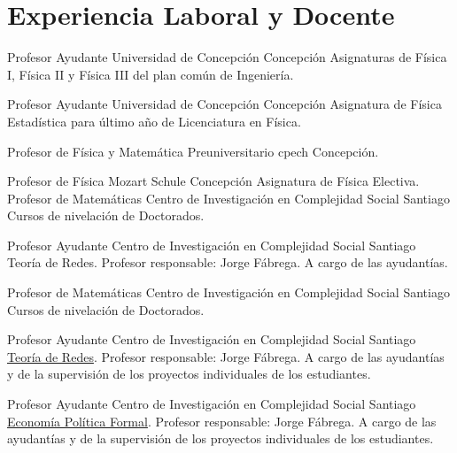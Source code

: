 \section{Experiencia Laboral y Docente}


        {Profesor Ayudante}
        {Universidad de Concepción}
        {Concepción} 
        {Asignaturas de Física I, Física II y Física III del plan común de Ingeniería.}   %
        {}

        {Profesor Ayudante}
        {Universidad de Concepción}
        {Concepción}
        {Asignatura de Física Estadística para último año de Licenciatura en Física.}  %
        {}


        {Profesor de Física y Matemática}
        {Preuniversitario cpech}
        {Concepción.}
        {}   %
        {}

        {Profesor de Física}
        {Mozart Schule}
        {Concepción}
        {Asignatura de Física Electiva.}   %
        {}
        {Profesor de Matemáticas}
        {Centro de Investigación en Complejidad Social}
        {Santiago}
        {\newline Cursos de nivelación de Doctorados.}
        {}

        {Profesor Ayudante}
        {Centro de Investigación en Complejidad Social}
        {Santiago}
        {\newline Teoría de Redes. Profesor responsable: Jorge Fábrega. A cargo de las ayudantías.}
        {}

        {Profesor de Matemáticas}
        {Centro de Investigación en Complejidad Social}
        {Santiago}
        {\newline Cursos de nivelación de Doctorados.}
        {}

        {Profesor Ayudante}
        {Centro de Investigación en Complejidad Social}
        {Santiago}
        {\newline \href{https://github.com/aoliveram/Redes-Sociales-2025}{Teoría de Redes}. Profesor responsable: Jorge Fábrega. A cargo de las ayudantías y de la supervisión de los proyectos individuales de los estudiantes.}
        {}

        {Profesor Ayudante}
        {Centro de Investigación en Complejidad Social}
        {Santiago}
        {\newline \href{https://github.com/aoliveram/Economia-Politica-Formal-2025}{Economía Política Formal}. Profesor responsable: Jorge Fábrega. A cargo de las ayudantías y de la supervisión de los proyectos individuales de los estudiantes.}
        {}

